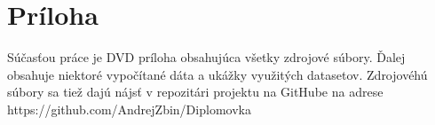 \chapter{Príloha}
Súčasťou práce je DVD príloha obsahujúca všetky zdrojové súbory.
Ďalej obsahuje niektoré vypočítané dáta a ukážky využitých datasetov.
Zdrojovéhú súbory sa tiež dajú nájsť v repozitári projektu na GitHube na adrese https://github.com/AndrejZbin/Diplomovka